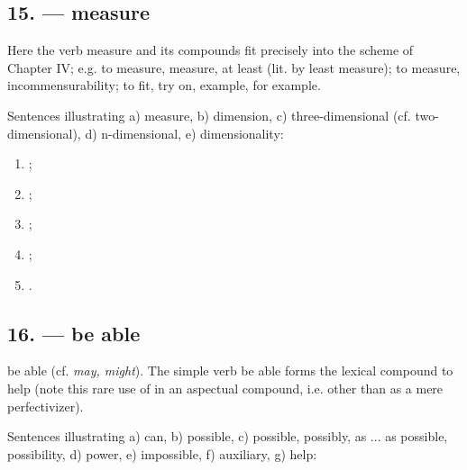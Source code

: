\subsection*{15.  --- measure}

Here the verb  measure and its compounds fit precisely into the scheme of Chapter IV; e.g.  to measure,  measure,  at least (lit. by least measure);  to measure,  incommensurability;  to fit, try on,  example,  for example.

Sentences illustrating a)  measure, b)  dimension, c)  three-dimensional (cf.  two-dimensional), d)  n-dimensional, e)  dimensionality:

\begin{enumerate}[label=\alph*)]
\item {};
\item {};
\item {};
\item {};
\item {}.
\end{enumerate}

\subsection*{16.  --- be able}

 be able (cf. \emph{may, might}). The simple verb  be able forms the lexical compound  to help (note this rare use of  in an aspectual compound, i.e. other than as a mere perfectivizer).

Sentences illustrating a)  can, b)  possible, c)  possible,  possibly, as ... as possible,  possibility, d)  power, e)  impossible, f)  auxiliary, g)  help:

